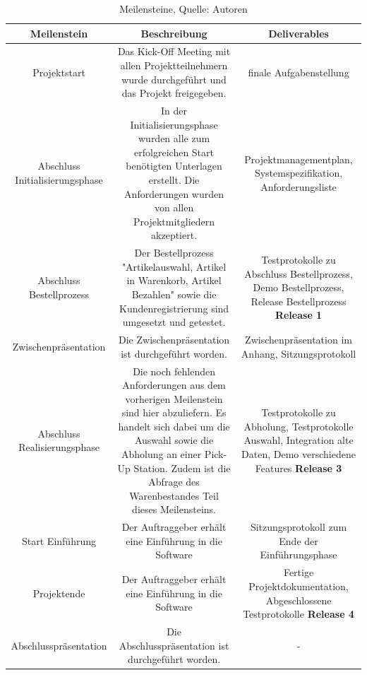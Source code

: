 \begin{table}[H]
\setlength\extrarowheight{2pt} %
\begin{tabularx}{\textwidth}{|C|C|C|}
\hline
\textbf{Meilenstein} &  \textbf{Beschreibung} & \textbf{Deliverables}  \\

\hline
Projektstart & Das Kick-Off Meeting mit allen Projektteilnehmern wurde durchgeführt und das Projekt freigegeben. & finale Aufgabenstellung\\

\hline
Abschluss Initialisierungsphase & In der Initialisierungsphase wurden alle zum erfolgreichen Start benötigten Unterlagen erstellt. Die Anforderungen wurden von allen Projektmitgliedern akzeptiert. & Projektmanagementplan, Systemspezifikation, Anforderungsliste\\


\hline
Abschluss Bestellprozess & Der Bestellprozess "Artikelauswahl, Artikel in Warenkorb, Artikel Bezahlen" sowie die Kundenregistrierung sind umgesetzt und getestet. & Testprotokolle zu Abschluss Bestellprozess, Demo Bestellprozess, Release Bestellprozess 
\newline
\textbf{Release 1}
 \\
 
 \hline
Zwischenpräsentation & Die Zwischenpräsentation ist durchgeführt worden.  & Zwischenpräsentation im Anhang, Sitzungsprotokoll
 \newline
 \\

\hline
Abschluss Realisierungsphase & Die noch fehlenden Anforderungen aus dem vorherigen Meilenstein sind hier abzuliefern. Es handelt sich dabei um die Auswahl sowie die Abholung an einer Pick-Up Station. Zudem ist die Abfrage des Warenbestandes Teil dieses Meilensteins. & Testprotokolle zu Abholung, Testprotokolle Auswahl, Integration alte Daten, Demo verschiedene Features
\newline
\textbf {Release 3}
\\

\hline
Start Einführung & Der Auftraggeber erhält eine Einführung in die Software & Sitzungsprotokoll zum Ende der Einführungsphase  
\\

\hline
Projektende & Der Auftraggeber erhält eine Einführung in die Software & Fertige Projektdokumentation, Abgeschlossene Testprotokolle   
\newline
\textbf{Release 4}
\\
\hline
Abschlusspräsentation & Die Abschlusspräsentation ist durchgeführt worden.  & - 
\newline
\\
\hline

\end{tabularx}
\caption{ \label{tbl: Meilensteine}Meilensteine, Quelle: Autoren}
\end{table}
\newpage
